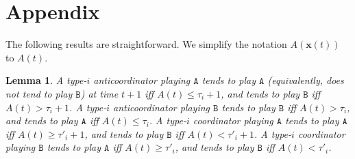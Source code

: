 \documentclass[10 pt,twocolumn,journal]{IEEEtran}
\DeclarePairedDelimiter{\ceil}{\lceil}{\rceil}
\DeclarePairedDelimiter{\floor}{\lfloor}{\rfloor}
\theoremstyle{plain}
\newtheorem{lemma}{Lemma}
\newcommand{\A}{\mathcal{A}}
\newcommand{\x}{\bm{x}}
\renewcommand{\A}{\mathtt{A}}
\newcommand{\B}{\mathtt{B}}
\theoremstyle{definition}
\begin{document}
\section*{Appendix}
The following results are straightforward.
We simplify the notation $A(\x(t))$ to $A(t)$.
\begin{lemma} \label{lem_updateRule}
    A type-$i$ anticoordinator playing $\A$ tends to play $\A$ (equivalently, does not tend to play $\B$) at time $t+1$ iff $A(t) \leq \tau_i +1$, %
    and tends to play $\B$ iff $A(t) > \tau_i +1$.
    A type-$i$ anticoordinator playing $\B$ tends to play $\B$ iff $A(t)> \tau_i$, and tends to play $\A$ iff $A(t)\leq  \tau_i$.
    A type-$i$ coordinator playing $\A$ tends to play $\A$ iff $A(t) \geq \tau'_i +1$, and tends to play $\B$ iff $A(t) < \tau'_i +1$. %
    A type-$i$ coordinator playing $\B$ tends to play $\A$ iff $A(t) \geq \tau'_i$, and tends to play $\B$ iff $A(t) < \tau'_i$. 
\end{lemma}
\end{document}
